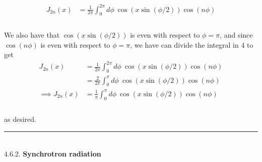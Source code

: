 \documentclass[]{article}
\begin{document}
\begin{enumerate}[a)]
\begin{equation}
\begin{aligned}
J_{2n}(x) & =    \frac{1}{2\pi} \int_{0}^{2\pi}  d\phi \:   \cos( x \sin(\phi/2)) \cos(n\phi)    \\
%
\end{aligned}
\end{equation} \\

We also have that $\cos( x \sin(\phi/2))$ is even with respect to $\phi = \pi$, and since $\cos(n\phi)$ is even with respect to $\phi = \pi$, we have can divide the integral in 4 to get \\

\begin{equation}
\begin{aligned}
J_{2n}(x) & =    \frac{1}{2\pi} \int_{0}^{2\pi}  d\phi \:   \cos( x \sin(\phi/2)) \cos(n\phi)    \\
%
& =  \frac{2}{2\pi} \int_{0}^{\pi}  d\phi \:   \cos( x \sin(\phi/2)) \cos(n\phi)  \\
\implies J_{2n}(x) & =  \frac{1}{\pi} \int_{0}^{\pi}  d\phi \:   \cos( x \sin(\phi/2)) \cos(n\phi)  \\
\end{aligned}
\end{equation} \\

as desired. \\











\end{enumerate}

\noindent\rule{15cm}{0.4pt} \\



4.6.2. {\bf Synchrotron radiation} \\
 
\end{document}
